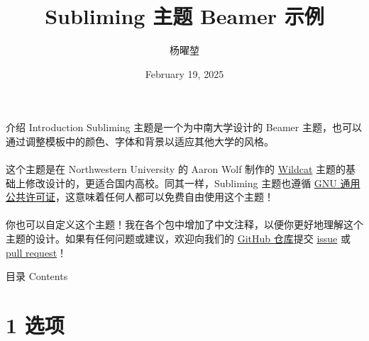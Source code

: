 \documentclass[10pt,aspectratio=169,fontset=none]{ctexbeamer}
\title{Subliming 主题 Beamer 示例}
\author{杨曜堃}
\institute{地球科学与信息物理学院}
\date{February 19, 2025}
\begin{document}
    \begin{frame}
        \titlepage
    \end{frame}

    \begin{frame}{介绍 Introduction}
        Subliming 主题是一个为中南大学设计的 Beamer 主题，也可以通过调整模板中的颜色、字体和背景以适应其他大学的风格。 
        \\ ~ \\
        这个主题是在 Northwestern University 的 Aaron Wolf 制作的 \href{https://github.com/aarondwolf/wildcatwildcat}{Wildcat} 主题的基础上修改设计的，更适合国内高校。同其一样，Subliming 主题也遵循 \href{http://www.gnu.org/licenses/}{GNU 通用公共许可证}，这意味着任何人都可以免费自由使用这个主题！
        \\ ~ \\
        你也可以自定义这个主题！我在各个包中增加了中文注释，以便你更好地理解这个主题的设计。如果有任何问题或建议，欢迎向我们的 \href{https://github.com/PourRevenir/Subliming}{GitHub 仓库}提交 \href{https://github.com/PourRevenir/Subliming/issues}{issue} 或 \href{https://github.com/PourRevenir/Subliming/pulls}{pull request}！
    \end{frame}

    \begin{frame}{目录 Contents}
        \tableofcontents
    \end{frame}

    \section{1 选项}
\end{document}

